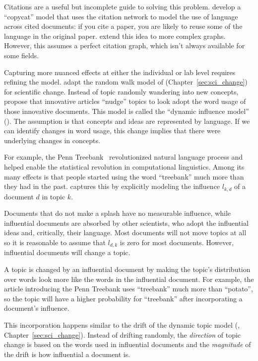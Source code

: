 Citations are a useful but incomplete guide to solving this problem.
\citet{dietz-07} develop a ``copycat'' model that uses the citation
network to model the use of language across cited documents: if you
cite a paper, you are likely to reuse some of the language in the
original paper.
\citet{he-09} extend this idea to more complex graphs.
However, this assumes a perfect citation graph, which isn't always
available for some fields.  

Capturing more nuanced effects at either the individual or lab level requires
refining the model.  \citet{gerrish-10} adapt the random walk model of
\citet{wang-08} (Chapter~\ref{sec:sci_change}) for scientific change.  Instead of topic randomly wandering into
new concepts, \citet{gerrish-10} propose that innovative articles ``nudge'' topics
to look adopt the word usage of those innovative documents.  This model is called the ``dynamic
influence model'' (). The assumption is that concepts and ideas are represented
by language. If we can identify changes in word usage, this change implies that there
were underlying changes in concepts.

For example, the Penn Treebank~\citep{marcus-93} revolutionized natural language
process and helped enable the statistical revolution in computational
linguistics.  Among its many effects is that people started using the word
``treebank'' much more than they had in the past.   captures this by
explicitly modeling the influence $l_{k,d}$ of a document $d$ in topic
$k$.

Documents that do not make a splash have no measurable influence, while influential
documents are absorbed by other scientists, who adopt the influential ideas and, critically, their language.  Most documents will not move topics
at all so it is reasonable to assume that $l_{d,k}$ is zero for most
documents.  However, influential documents will change a topic.

A topic is changed by an influential document by making the topic's
distribution over words look more like the words in the influential document.  For example, the article
introducing the Penn Treebank uses ``treebank'' much more than
``potato'', so the topic will have a higher probability for
``treebank'' after incorporating a document's influence.

This incorporation happens similar to the drift of the dynamic topic
model (, Chapter~\ref{sec:sci_change}).  Instead of drifting
randomly, the \emph{direction} of topic change is based on the words
used in influential documents and the \emph{magnitude} of the drift is
how influential a document is.

